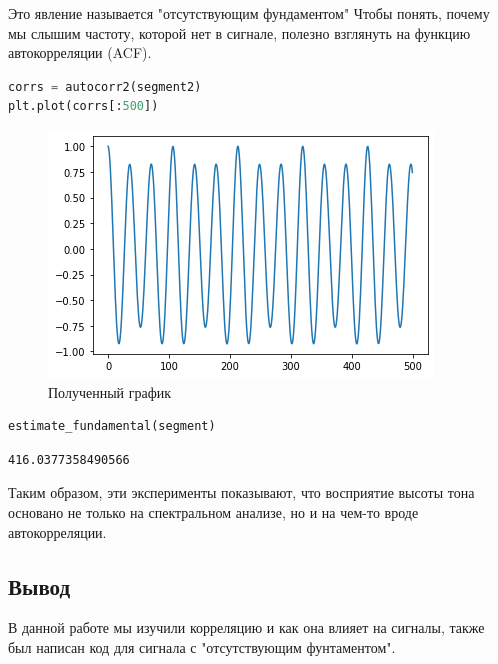 Это явление называется "отсутствующим фундаментом"
Чтобы понять, почему мы слышим частоту, которой нет в сигнале, полезно взглянуть на функцию автокорреляции (ACF).

\begin{lstlisting}[language=Python]
corrs = autocorr2(segment2)
plt.plot(corrs[:500])
\end{lstlisting}

\begin{figure}[H]
	\begin{center}
		\includegraphics[scale=1]{fig/lab05/lab05_11.png}
		\caption{Полученный график}
	\end{center}
\end{figure}

\begin{lstlisting}[language=Python]
estimate_fundamental(segment)
\end{lstlisting}

\begin{lstlisting}
416.0377358490566
\end{lstlisting}

Таким образом, эти эксперименты показывают, что восприятие высоты тона основано не только на спектральном анализе, но и на чем-то вроде автокорреляции.

\subsection{Вывод}

В данной работе мы изучили корреляцию и как она влияет на сигналы, также был написан код для сигнала с "отсутствующим фунтаментом".


